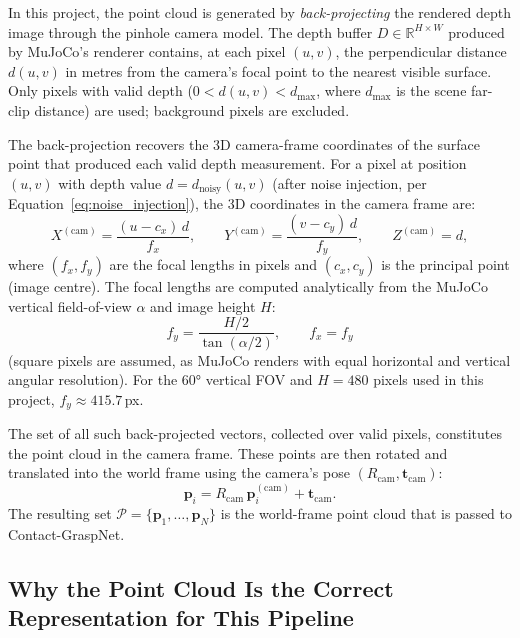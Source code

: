 \documentclass[11pt,a4paper]{report}
\begin{document}
In this project, the point cloud is generated by \emph{back-projecting} the
rendered depth image through the pinhole camera model.  The depth buffer
$D \in \mathbb{R}^{H \times W}$ produced by MuJoCo's renderer contains, at each
pixel $(u, v)$, the perpendicular distance $d(u,v)$ in metres from the camera's
focal point to the nearest visible surface.  Only pixels with valid depth
($0 < d(u,v) < d_{\max}$, where $d_{\max}$ is the scene far-clip distance) are
used; background pixels are excluded.

The back-projection recovers the 3D camera-frame coordinates of the surface point
that produced each valid depth measurement.  For a pixel at position $(u, v)$ with
depth value $d = d_{\text{noisy}}(u, v)$ (after noise injection, per
Equation~\eqref{eq:noise_injection}), the 3D coordinates in the camera frame are:
\begin{equation}
  X^{(\text{cam})} = \frac{(u - c_x)\, d}{f_x}, \qquad
  Y^{(\text{cam})} = \frac{(v - c_y)\, d}{f_y}, \qquad
  Z^{(\text{cam})} = d,
  \label{eq:backproject}
\end{equation}
where $(f_x, f_y)$ are the focal lengths in pixels and $(c_x, c_y)$ is the
principal point (image centre).  The focal lengths are computed analytically from
the MuJoCo vertical field-of-view $\alpha$ and image height $H$:
\begin{equation}
  f_y = \frac{H/2}{\tan(\alpha/2)}, \qquad f_x = f_y
  \label{eq:focal_from_fov}
\end{equation}
(square pixels are assumed, as MuJoCo renders with equal horizontal and vertical
angular resolution).  For the 60° vertical FOV and $H = 480$ pixels used in
this project, $f_y \approx 415.7$\,px.

The set of all such back-projected vectors, collected over valid pixels, constitutes
the point cloud in the camera frame.  These points are then rotated and translated
into the world frame using the camera's pose $(R_{\text{cam}}, \mathbf{t}_{\text{cam}})$:
\begin{equation}
  \mathbf{p}_i = R_{\text{cam}}\, \mathbf{p}_i^{(\text{cam})} + \mathbf{t}_{\text{cam}}.
  \label{eq:world_frame_points}
\end{equation}
The resulting set $\mathcal{P} = \{\mathbf{p}_1, \ldots, \mathbf{p}_N\}$ is the
world-frame point cloud that is passed to Contact-GraspNet.

\subsection{Why the Point Cloud Is the Correct Representation for This Pipeline}
\label{sec:pointcloud_justification}
\end{document}
